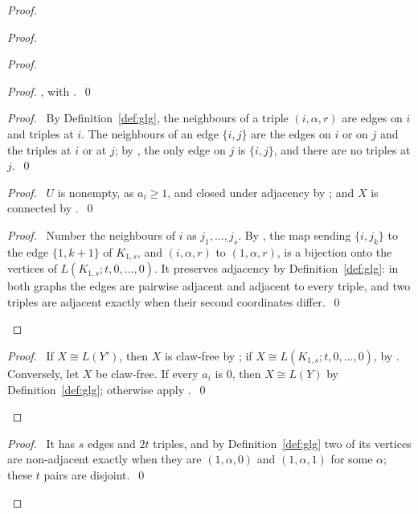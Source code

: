 \begin{proof}
\begin{proof}
\begin{proof}
\begin{proof}
    , with .~\qed\end{proof}
   \begin{proof}\pf\ By Definition~\ref{def:glg}, the neighbours of a triple $(i,\alpha,r)$ are
    edges on $i$ and triples at $i$. The neighbours of an edge $\{i,j\}$ are the edges on $i$ or
    on $j$ and the triples at $i$ or at $j$; by , the only edge on $j$ is
    $\{i,j\}$, and there are no triples at $j$.~\qed\end{proof}
   \begin{proof}\pf\ $U$ is nonempty, as $a_i\ge1$, and closed under adjacency by
    ; and $X$ is connected by .~\qed\end{proof}
   \qedstep
   \begin{proof}\pf\ Number the neighbours of $i$ as $j_1,\dots,j_s$. By , the
    map sending $\{i,j_k\}$ to the edge $\{1,k+1\}$ of $K_{1,s}$, and $(i,\alpha,r)$ to
    $(1,\alpha,r)$, is a bijection onto the vertices of $L(K_{1,s};t,0,\dots,0)$. It preserves
    adjacency by Definition~\ref{def:glg}: in both graphs the edges are pairwise adjacent and
    adjacent to every triple, and two triples are adjacent exactly when their second coordinates
    differ.~\qed\end{proof}
  \end{proof}
  \qedstep
  \begin{proof}\pf\ If $X\cong L(Y')$, then $X$ is claw-free by ; if $X\cong
   L(K_{1,s};t,0,\dots,0)$, by . Conversely, let $X$ be claw-free. If every
   $a_i$ is 0, then $X\cong L(Y)$ by Definition~\ref{def:glg}; otherwise apply
   .~\qed\end{proof}
 \end{proof}
 \begin{proof}\pf\ It has $s$ edges and $2t$ triples, and by Definition~\ref{def:glg} two of its
  vertices are non-adjacent exactly when they are $(1,\alpha,0)$ and $(1,\alpha,1)$ for some
  $\alpha$; these $t$ pairs are disjoint.~\qed\end{proof}
\end{proof}
